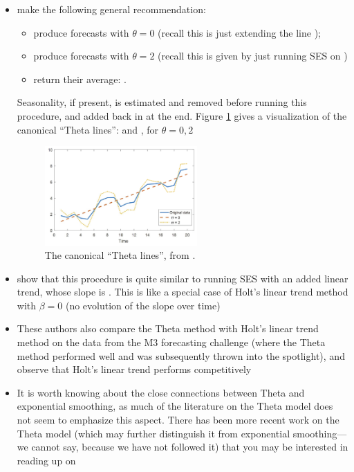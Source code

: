 \documentclass{article}
\begin{document}
\begin{itemize}
\item \citet{assimakopoulos2000theta} make the following general recommendation:
  \begin{itemize}
  \item produce forecasts  with $\theta = 0$ (recall 
    this is just extending the line );
  \item produce forecasts  with $\theta = 2$ (recall 
    this is given by just running SES on ) 
  \item return their average: . 
  \end{itemize}
  Seasonality, if present, is estimated and removed before running this
  procedure, and added back in at the end. Figure \ref{fig:theta} gives a
  visualization of the canonical ``Theta lines'':  and 
  , for $\theta = 0,2$

\begin{figure}[htb]
\centering
\includegraphics[width=0.55\textwidth]{theta.png}
\caption{The canonical ``Theta lines'', from \citet{dudek2019short}.}      
\label{fig:theta}
\end{figure}

\item \citet{hyndman2003unmasking} show that this procedure is quite similar to
  running SES with an added linear trend, whose slope is . This is like a special case of Holt's linear trend method with $\beta =
  0$ (no evolution of the slope over time)   

\item These authors also compare the Theta method with Holt's linear trend
  method on the data from the M3 forecasting challenge (where the Theta method
  performed well and was subsequently thrown into the spotlight), and observe
  that Holt's linear trend performs competitively  

\item It is worth knowing about the close connections between Theta and
  exponential smoothing, as much of the literature on the Theta model does not
  seem to emphasize this aspect. There has been more recent work on the Theta
  model (which may further distinguish it from exponential smoothing---we cannot
  say, because we have not followed it) that you may be interested in reading up
  on    
\end{itemize}
\end{document}
